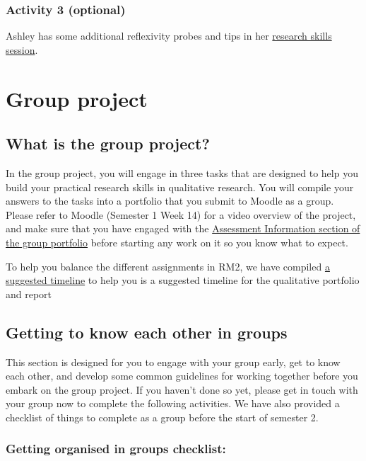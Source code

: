 \documentclass[
  english,
  letterpaper,
  DIV=11,
  numbers=noendperiod]{scrreprt}
\begin{document}
\subsection{Activity 3 (optional)}\label{activity-3-optional}

Ashley has some additional reflexivity probes and tips in her
\hyperref[reflexivity_skills_session]{research skills session}.

\chapter{Group project}\label{ch10_group_project}

\section{What is the group project?}\label{what-is-the-group-project}

In the group project, you will engage in three tasks that are designed
to help you build your practical research skills in qualitative
research. You will compile your answers to the tasks into a portfolio
that you submit to Moodle as a group. Please refer to Moodle (Semester 1
Week 14) for a video overview of the project, and make sure that you
have engaged with the \hyperref[ch3_AIS_portfolio]{Assessment
Information section of the group portfolio} before starting any work on
it so you know what to expect.

To help you balance the different assignments in RM2, we have compiled
\href{https://gla-my.sharepoint.com/:w:/g/personal/ashley_robertson_glasgow_ac_uk/EQM2Fzsi0FJAlDKTJXgi7-8Brm7ITIBw5ta3MaXSiDZfrg?e=FMLoM4}{a
suggested timeline} to help you is a suggested timeline for the
qualitative portfolio and report

\section{Getting to know each other in
groups}\label{getting-to-know-each-other-in-groups}

This section is designed for you to engage with your group early, get to
know each other, and develop some common guidelines for working together
before you embark on the group project. If you haven't done so yet,
please get in touch with your group now to complete the following
activities. We have also provided a checklist of things to complete as a
group before the start of semester 2.

\subsection{Getting organised in groups
checklist:}\label{getting-organised-in-groups-checklist}
\end{document}
